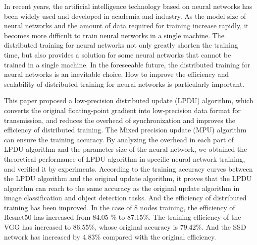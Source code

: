 \begin{eabstract}
In recent years, the artificial intelligence technology based on neural networks has been widely used and developed in academia and industry. As the model size of neural networks and the amount of data required for training increase rapidly, it becomes more difficult to train neural networks in a single machine. The distributed training for neural networks not only greatly shorten the training time, but also provides a solution for some neural networks that cannot be trained in a single machine. In the foreseeable future, the distributed training for neural networks is an inevitable choice. How to improve the efficiency and scalability of distributed training for neural networks is particularly important.

This paper proposed a low-precision distributed update (LPDU) algorithm, which converts the original floating-point gradient into low-precision data format for transmission, and reduces the overhead of synchronization and improves the efficiency of distributed training. The Mixed precision update (MPU) algorithm can ensure the training accuracy. By analyzing the overhead in each part of LPDU algorithm and the parameter size of the neural network, we obtained the theoretical performance of LPDU algorithm in specific neural network training, and verified it by experiments. According to the training accuracy curves between the LPDU algorithm and the original update algorithm, it proves that the LPDU algorithm can reach to the same accuracy as the original update algorithm in image classification and object detection tasks. And the efficiency of distributed training has been improved. In the case of 8 nodes training, the efficiency of Resnet50 has increased from 84.05 \% to 87.15\%. The training efficiency of the VGG has increased to 86.55\%, whose original accuracy is 79.42\%. And the SSD network has increased by 4.83\% compared with the original efficiency.


\end{eabstract}
